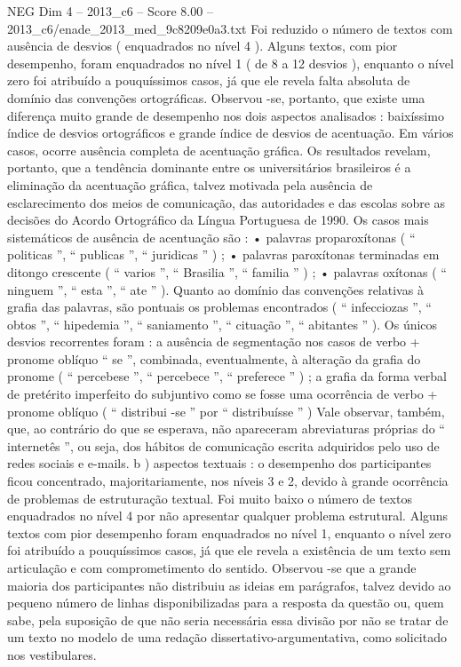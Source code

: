 \begin{textsample}{NEG Dim 4 – 2013\_c6 – Score 8.00 – 2013\_c6/enade\_2013\_med\_9c8209e0a3.txt}
Foi reduzido o número de textos com ausência de desvios ( enquadrados no nível 4 ).
Alguns textos, com pior desempenho, foram enquadrados no nível 1 ( de 8 a 12 desvios ), enquanto o nível zero foi atribuído a pouquíssimos casos, já que ele revela falta absoluta de domínio das convenções ortográficas.
Observou -se, portanto, que existe uma diferença muito grande de desempenho nos dois aspectos analisados : baixíssimo índice de desvios ortográficos e grande índice de desvios de acentuação.
Em vários casos, ocorre ausência completa de acentuação gráfica.
Os resultados revelam, portanto, que a tendência dominante entre os universitários brasileiros é a eliminação da acentuação gráfica, talvez motivada pela ausência de esclarecimento dos meios de comunicação, das autoridades e das escolas sobre as decisões do Acordo Ortográfico da Língua Portuguesa de 1990.
Os casos mais sistemáticos de ausência de acentuação são : • palavras proparoxítonas ( “ politicas ”, “ publicas ”, “ juridicas ” ) ; • palavras paroxítonas terminadas em ditongo crescente ( “ varios ”, “ Brasilia ”, “ familia ” ) ; • palavras oxítonas ( “ ninguem ”, “ esta ”, “ ate ” ).
Quanto ao domínio das convenções relativas à grafia das palavras, são pontuais os problemas encontrados ( “ infecciozas ”, “ obtos ”, “ hipedemia ”, “ saniamento ”, “ cituação ”, “ abitantes ” ).
Os únicos desvios recorrentes foram : a ausência de segmentação nos casos de verbo + pronome oblíquo “ se ”, combinada, eventualmente, à alteração da grafia do pronome ( “ percebese ”, “ percebece ”, “ preferece ” ) ; a grafia da forma verbal de pretérito imperfeito do subjuntivo como se fosse uma ocorrência de verbo + pronome oblíquo ( “ distribui -se ” por “ distribuísse ” ) Vale observar, também, que, ao contrário do que se esperava, não apareceram abreviaturas próprias do “ internetês ”, ou seja, dos hábitos de comunicação escrita adquiridos pelo uso de redes sociais e e-mails. b ) aspectos textuais : o desempenho dos participantes ficou concentrado, majoritariamente, nos níveis 3 e 2, devido à grande ocorrência de problemas de estruturação textual.
Foi muito baixo o número de textos enquadrados no nível 4 por não apresentar qualquer problema estrutural.
Alguns textos com pior desempenho foram enquadrados no nível 1, enquanto o nível zero foi atribuído a pouquíssimos casos, já que ele revela a existência de um texto sem articulação e com comprometimento do sentido.
Observou -se que a grande maioria dos participantes não distribuiu as ideias em parágrafos, talvez devido ao pequeno número de linhas disponibilizadas para a resposta da questão ou, quem sabe, pela suposição de que não seria necessária essa divisão por não se tratar de um texto no modelo de uma redação dissertativo-argumentativa, como solicitado nos vestibulares.

\end{textsample}
